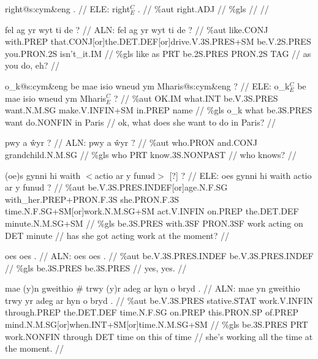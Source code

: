 \documentclass[a4paper,10pt]{article}
\begin{document}
\ex
\begingl[lingstyle=gergl]
\glchat right@s:cym\&eng . //
\glsurface ELE:  right$^{C}_{E}$ .  //
\glauto \%aut  right{\scriptsize .ADJ}   //
\glmanual \%gls     //
\gleng  //
\endgl
\xe

\ex
\begingl[lingstyle=gergl]
\glchat fel ag yr wyt ti de ? //
\glsurface ALN:  fel ag yr wyt ti de ?  //
\glauto \%aut  like{\scriptsize .CONJ} with{\scriptsize .PREP} that{\scriptsize .CONJ[or]the.DET.DEF[or]drive.V.3S.PRES+SM} be{\scriptsize .V.2S.PRES} you{\scriptsize .PRON.2S} isn't\_it{\scriptsize .IM}   //
\glmanual \%gls  like as PRT be{\scriptsize .2S.PRES} PRON{\scriptsize .2S} TAG   //
\gleng as you do, eh? //
\endgl
\xe

\ex
\begingl[lingstyle=gergl]
\glchat o\_k@s:cym\&eng be mae isio wneud ym Mharis@s:cym\&eng ? //
\glsurface ELE:  o\_k$^{C}_{E}$ be mae isio wneud ym Mharis$^{C}_{E}$ ?  //
\glauto \%aut  OK{\scriptsize .IM} what{\scriptsize .INT} be{\scriptsize .V.3S.PRES} want{\scriptsize .N.M.SG} make{\scriptsize .V.INFIN+SM} in{\scriptsize .PREP} name   //
\glmanual \%gls  o\_k what be{\scriptsize .3S.PRES} want do{\scriptsize .NONFIN} in Paris   //
\gleng ok, what does she want to do in Paris? //
\endgl
\xe

\ex
\begingl[lingstyle=gergl]
\glchat pwy a ŵyr ? //
\glsurface ALN:  pwy a ŵyr ?  //
\glauto \%aut  who{\scriptsize .PRON} and{\scriptsize .CONJ} grandchild{\scriptsize .N.M.SG}   //
\glmanual \%gls  who PRT know{\scriptsize .3S.NONPAST}   //
\gleng who knows? //
\endgl
\xe

\ex
\begingl[lingstyle=gergl]
\glchat (oe)s gynni hi waith $<$actio ar y funud$>$ [?] ? //
\glsurface ELE:  oes gynni hi waith actio ar y funud ?  //
\glauto \%aut  be{\scriptsize .V.3S.PRES.INDEF[or]age.N.F.SG} with\_her{\scriptsize .PREP+PRON.F.3S} she{\scriptsize .PRON.F.3S} time{\scriptsize .N.F.SG+SM[or]work.N.M.SG+SM} act{\scriptsize .V.INFIN} on{\scriptsize .PREP} the{\scriptsize .DET.DEF} minute{\scriptsize .N.M.SG+SM}   //
\glmanual \%gls  be{\scriptsize .3S.PRES} with{\scriptsize .3SF} PRON{\scriptsize .3SF} work acting on DET minute   //
\gleng has she got acting work at the moment? //
\endgl
\xe

\ex
\begingl[lingstyle=gergl]
\glchat oes oes . //
\glsurface ALN:  oes oes .  //
\glauto \%aut  be{\scriptsize .V.3S.PRES.INDEF} be{\scriptsize .V.3S.PRES.INDEF}   //
\glmanual \%gls  be{\scriptsize .3S.PRES} be{\scriptsize .3S.PRES}   //
\gleng yes, yes. //
\endgl
\xe

\ex
\begingl[lingstyle=gergl]
\glchat mae (y)n gweithio \# trwy (y)r adeg ar hyn o bryd . //
\glsurface ALN:  mae yn gweithio trwy yr adeg ar hyn o bryd .  //
\glauto \%aut  be{\scriptsize .V.3S.PRES} stative{\scriptsize .STAT} work{\scriptsize .V.INFIN} through{\scriptsize .PREP} the{\scriptsize .DET.DEF} time{\scriptsize .N.F.SG} on{\scriptsize .PREP} this{\scriptsize .PRON.SP} of{\scriptsize .PREP} mind{\scriptsize .N.M.SG[or]when.INT+SM[or]time.N.M.SG+SM}   //
\glmanual \%gls  be{\scriptsize .3S.PRES} PRT work{\scriptsize .NONFIN} through DET time on this of time   //
\gleng she's working all the time at the moment. //
\endgl
\xe
\end{document}
